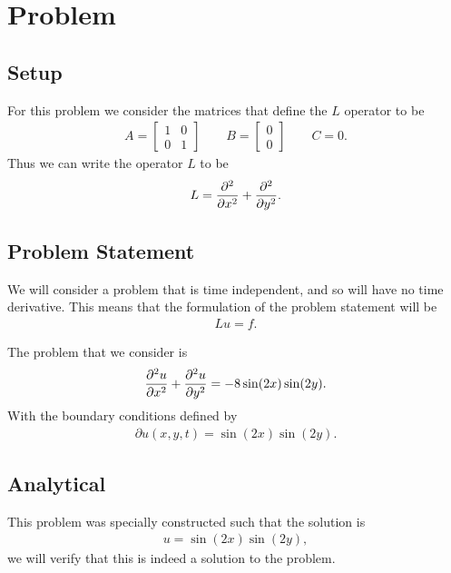 \documentclass[../fem.tex]{subfile}
\begin{document}
\section{Problem}%
\label{sec:problem}

\subsection{Setup}%
\label{sub:setup}

For this problem we consider the matrices that define the $L$ operator to be
\begin{align*}
  A=\begin{bmatrix}
    1 & 0\\ 0 & 1
  \end{bmatrix}\qquad
  B=\begin{bmatrix}
    0 \\ 0
  \end{bmatrix}\qquad
  C=0.
\end{align*}
Thus we can write the operator $L$ to be
\begin{align*}
  L=\frac{\partial^2 }{\partial {x}^2}+\frac{\partial^2 }{\partial {y}^2}.
\end{align*}

\subsection{Problem Statement}%
\label{sub:problem_statement}

We will consider a problem that is time independent, and so will have no time
derivative. This means that the formulation of the problem statement will be
\begin{align*}
  Lu=f.
\end{align*}

The problem that we consider is
\begin{align}
  \frac{\partial^2 u}{\partial {x}^2}+\frac{\partial^2 u}{\partial {y}^2}=-8\sin(2x)\sin(2y).
\end{align}
With the boundary conditions defined by
\begin{align*}
  \partial u(x, y, t)=\sin(2x)\sin(2y).
\end{align*}

\subsection{Analytical}%
\label{sub:analytical}

This problem was specially constructed such that the solution is
\begin{align*}
  u=\sin(2x)\sin(2y),
\end{align*}
we will verify that this is indeed a solution to the problem.
\end{document}
